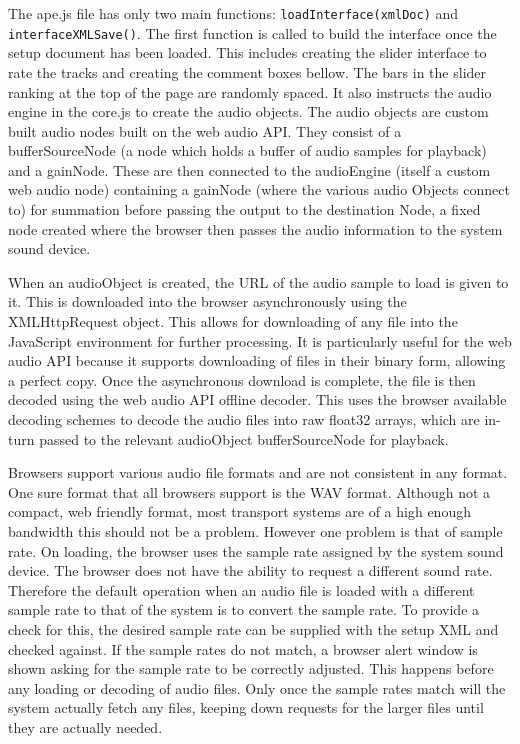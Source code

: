 \documentclass{article}
\begin{document}
The ape.js file has only two main functions: \texttt{loadInterface(xmlDoc)} and \texttt{interfaceXMLSave()}. The first function is called to build the interface once the setup document has been loaded. This includes creating the slider interface to rate the tracks and creating the comment boxes bellow. The bars in the slider ranking at the top of the page are randomly spaced. It also instructs the audio engine in the core.js to create the audio objects. The audio objects are custom built audio nodes built on the web audio API. They consist of a bufferSourceNode (a node which holds a buffer of audio samples for playback) and a gainNode. These are then connected to the audioEngine (itself a custom web audio node) containing a gainNode (where the various audio Objects connect to) for summation before passing the output to the destination Node, a fixed node created where the browser then passes the audio information to the system sound device.

When an audioObject is created, the URL of the audio sample to load is given to it. This is downloaded into the browser asynchronously using the XMLHttpRequest object. This allows for downloading of any file into the JavaScript environment for further processing. It is particularly useful for the web audio API because it supports downloading of files in their binary form, allowing a perfect copy. Once the asynchronous download is complete, the file is then decoded using the web audio API offline decoder. This uses the browser available decoding schemes to decode the audio files into raw float32 arrays, which are in-turn passed to the relevant audioObject bufferSourceNode for playback.

Browsers support various audio file formats and are not consistent in any format. One sure format that all browsers support is the WAV format. Although not a compact, web friendly format, most transport systems are of a high enough bandwidth this should not be a problem. However one problem is that of sample rate. On loading, the browser uses the sample rate assigned by the system sound device. The browser does not have the ability to request a different sound rate. Therefore the default operation when an audio file is loaded with a different sample rate to that of the system is to convert the sample rate. To provide a check for this, the desired sample rate can be supplied with the setup XML and checked against. If the sample rates do not match, a browser alert window is shown asking for the sample rate to be correctly adjusted. This happens before any loading or decoding of audio files. Only once the sample rates match will the system actually fetch any files, keeping down requests for the larger files until they are actually needed.
\end{document}
